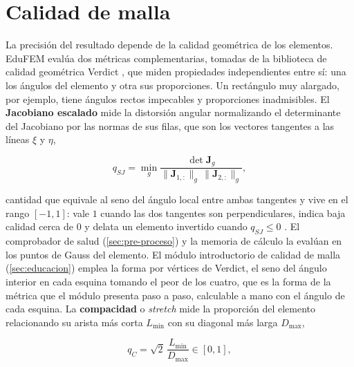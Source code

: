 \section{Calidad de malla}
\label{sec:calidad-malla}

La precisión del resultado depende de la calidad geométrica de los elementos. EduFEM evalúa dos métricas complementarias, tomadas de la biblioteca de calidad geométrica Verdict \autocite[p.~3]{stimpson2007verdict}, que miden propiedades independientes entre sí: una los ángulos del elemento y otra sus proporciones. Un rectángulo muy alargado, por ejemplo, tiene ángulos rectos impecables y proporciones inadmisibles. El \textbf{Jacobiano escalado} mide la distorsión angular normalizando el determinante del Jacobiano por las normas de sus filas, que son los vectores tangentes a las líneas $\xi$ y $\eta$,

\begin{equation}
q_{SJ} = \min_g \frac{\det\bm{J}_g}{\|\bm{J}_{1,:}\|_g\,\|\bm{J}_{2,:}\|_g},
\label{eq:scaled-jacobian}
\end{equation}

cantidad que equivale al seno del ángulo local entre ambas tangentes y vive en el rango $[-1, 1]$: vale $1$ cuando las dos tangentes son perpendiculares, indica baja calidad cerca de $0$ y delata un elemento invertido cuando $q_{SJ} \le 0$ \autocite[p.~51]{stimpson2007verdict}. El comprobador de salud (\autoref{sec:pre-proceso}) y la memoria de cálculo la evalúan en los puntos de Gauss del elemento. El módulo introductorio de calidad de malla (\autoref{sec:educacion}) emplea la forma por vértices de Verdict, el seno del ángulo interior en cada esquina tomando el peor de los cuatro, que es la forma de la métrica que el módulo presenta paso a paso, calculable a mano con el ángulo de cada esquina. La \textbf{compacidad} o \emph{stretch} mide la proporción del elemento relacionando su arista más corta $L_{\min}$ con su diagonal más larga $D_{\max}$,

\begin{equation}
q_C = \sqrt{2}\,\frac{L_{\min}}{D_{\max}} \in [0, 1],
\label{eq:stretch}
\end{equation}

